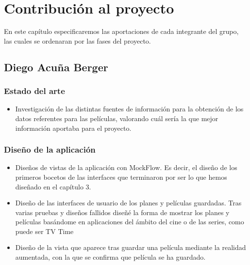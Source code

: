 
\cleardoublepage


\chapter{Contribución al proyecto}
\label{makereference7}
En este capítulo especificaremos las aportaciones de cada integrante del grupo,
 las cuales se ordenaran por las fases del proyecto.

\section{Diego Acuña Berger}
\label{makereference7.1}
    \subsection{Estado del arte}
    \label{makereference7.1.1}
        \begin{itemize}
            \item Investigación de las distintas fuentes de información para la obtención de los datos referentes para las películas, valorando cuál sería la que mejor información aportaba para el proyecto.
        \end{itemize}
    \subsection{Diseño de la aplicación}
    \label{makereference7.1.2}
        \begin{itemize}
            \item Diseños de vistas de la aplicación con MockFlow. Es decir, el diseño de los primeros bocetos de las interfaces que terminaron por ser lo que hemos diseñado en el capítulo 3.
            \item Diseño de las interfaces de usuario de los planes y películas
            guardadas. Tras varias pruebas y diseños fallidos diseñé la forma de mostrar los planes y películas basándome en aplicaciones del ámbito del cine o de las series, como puede ser TV Time \cite{tvtime}
            \item Diseño de la vista que aparece tras guardar una película mediante la realidad aumentada, con la que se confirma que película se ha guardado.
        \end{itemize}

